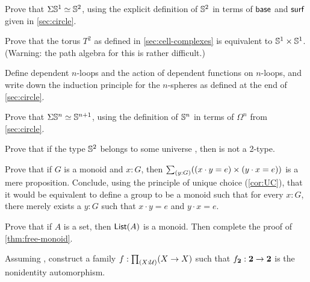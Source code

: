 \begin{ex}\label{ex:suspS1}
  Prove that $\Sigma \mathbb{S}^1 \simeq \mathbb{S}^2$, using the explicit definition of $\mathbb{S}^2$ in terms of $\mathsf{base}$ and $\mathsf{surf}$ given in \cref{sec:circle}.
\end{ex}

\begin{ex}\label{ex:torus-s1-times-s1}
  Prove that the torus $T^2$ as defined in \cref{sec:cell-complexes} is equivalent to $\mathbb{S}^1\times \mathbb{S}^1$.
  (Warning: the path algebra for this is rather difficult.)
\end{ex}

\begin{ex}\label{ex:nspheres}
  Define dependent $n$-loops and the action of dependent functions on $n$-loops, and write down the induction principle for the $n$-spheres as defined at the end of \cref{sec:circle}.
\end{ex}

\begin{ex}\label{ex:susp-spheres-equiv}
  Prove that $\Sigma \mathbb{S}^n \simeq \mathbb{S}^{n+1}$, using the definition of $\mathbb{S}^n$ in terms of $\Omega^n$ from \cref{sec:circle}.
\end{ex}

\begin{ex}\label{ex:spheres-make-U-not-2-type}
  Prove that if the type $\mathbb{S}^2$ belongs to some universe \type, then \type is not a 2-type.
\end{ex}

\begin{ex}\label{ex:monoid-eq-prop}
  Prove that if $G$ is a monoid and $x:G$, then $\sm{y:G}((x\cdot y = e) \times (y\cdot x =e))$ is a mere proposition.
  Conclude, using the principle of unique choice (\cref{cor:UC}), that it would be equivalent to define a group to be a monoid such that for every $x:G$, there merely exists a $y:G$ such that $x\cdot y = e$ and $y\cdot x=e$.
\end{ex}

\begin{ex}\label{ex:free-monoid}
  Prove that if $A$ is a set, then $\mathsf{List}(A)$ is a monoid.
  Then complete the proof of \cref{thm:free-monoid}.
\end{ex}

\begin{ex}\label{ex:unnatural-endomorphisms}
  Assuming \LEM{}, construct a family $f:\prd{X:\type}(X\to X)$ such that $f_\mathbf{2}:\mathbf{2}\to\mathbf{2}$ is the nonidentity automorphism.
\end{ex}

